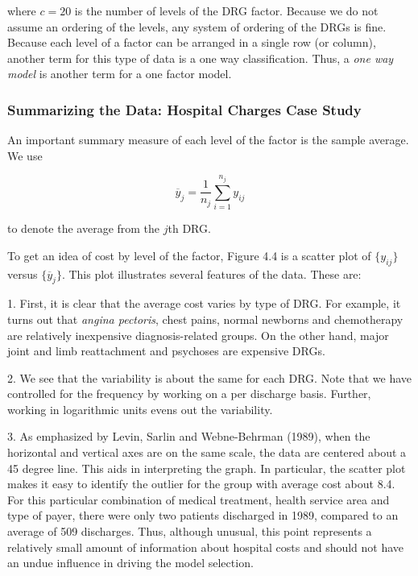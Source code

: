 \noindent where $c=20$ is the number of levels of the DRG factor.
Because we do not assume an ordering of the levels, any system of
ordering of the DRGs is fine. Because each level of a factor can be
arranged in a single row (or column), another term for this type of
data is a one way classification. Thus, a \textit{one way model} is
another term for a one factor model.

\subsubsection*{Summarizing the Data: Hospital Charges Case Study}

An important summary measure of each level of the factor is the sample
average. We use

\begin{equation*}
\overline{y}_{j}=\frac{1}{n_{j}}\sum_{i=1}^{n_{j}}y_{ij}
\end{equation*}

\noindent to denote the average from the $j$th DRG.

To get an idea of cost by level of the factor, Figure 4.4 is a
scatter plot of $\{y_{ij}\}$ versus $\{\overline{y}_{j}\}$. This
plot illustrates several features of the data. These are:

1. First, it is clear that the average cost varies by type of DRG. For
example, it turns out that \textit{angina pectoris}, chest pains, normal
newborns and chemotherapy are relatively inexpensive diagnosis-related
groups. On the other hand, major joint and limb reattachment and psychoses
are expensive DRGs.

2. We see that the variability is about the same for each DRG. Note
that we have controlled for the frequency by working on a per
discharge basis. Further, working in logarithmic units evens out the
variability.

3. As emphasized by Levin, Sarlin and Webne-Behrman (1989), when the
horizontal and vertical axes are on the same scale, the data are
centered about a 45 degree line. This aids in interpreting the
graph. In particular, the scatter plot makes it easy to identify the
outlier for the group with average cost about 8.4. For this
particular combination of medical treatment, health service area and
type of payer, there were only two patients discharged in 1989,
compared to an average of 509 discharges. Thus, although unusual,
this point represents a relatively small amount of information about
hospital costs and should not have an undue influence in driving the
model selection.

